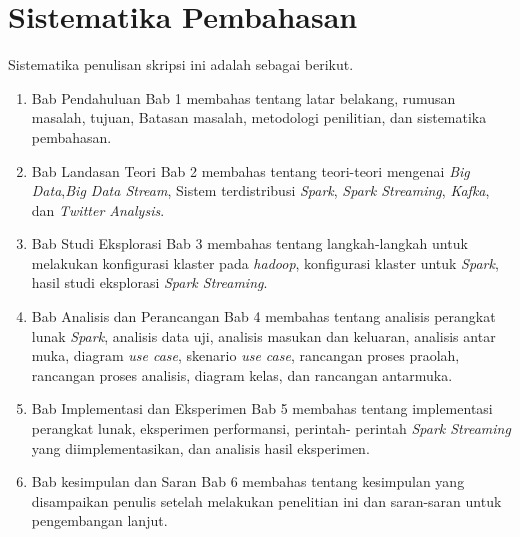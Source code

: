 \section{Sistematika Pembahasan}
Sistematika penulisan skripsi ini adalah sebagai berikut.
\begin{enumerate}
	\item{Bab Pendahuluan \newline
		Bab 1 membahas tentang latar belakang, rumusan masalah, tujuan, Batasan masalah, 				metodologi penilitian, dan sistematika pembahasan.
	}
	
	\item{Bab Landasan Teori \newline
		Bab 2 membahas tentang teori-teori mengenai \textit{Big Data},\textit{Big Data Stream},
		Sistem terdistribusi \textit{Spark}, \textit{Spark Streaming}, \textit{Kafka}, 	dan 					\textit{Twitter Analysis}.
	}
	
	\item{Bab Studi Eksplorasi \newline
		Bab 3 membahas tentang langkah-langkah untuk melakukan konfigurasi klaster pada 				\textit{hadoop}, konfigurasi klaster untuk \textit{Spark}, hasil studi eksplorasi 				\textit{Spark Streaming}.
	}
	
	\item{Bab Analisis dan Perancangan \newline
		Bab 4 membahas tentang analisis perangkat lunak \textit{Spark}, analisis data uji, 				analisis masukan dan keluaran, analisis antar muka, diagram \textit{use case}, skenario 		\textit{use case}, rancangan proses praolah, rancangan proses analisis, diagram kelas,
		dan rancangan antarmuka.
	}
	
	\item{Bab Implementasi dan Eksperimen \newline
		Bab 5 membahas tentang implementasi perangkat lunak, eksperimen performansi, perintah-       		perintah \textit{Spark Streaming} yang diimplementasikan, dan analisis hasil 					eksperimen.
	}
	
	\item{Bab kesimpulan dan Saran \newline
		Bab 6 membahas tentang kesimpulan yang disampaikan penulis setelah melakukan penelitian 		ini dan saran-saran untuk pengembangan lanjut.
	}
\end{enumerate}
\label{sec:sispem}
